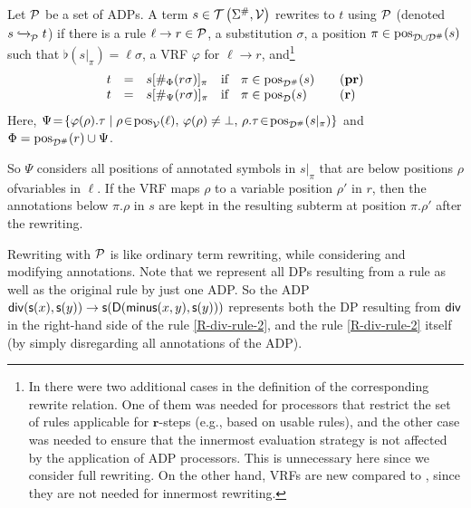 \begin{definition}[$\tored{}{}{\C{P}}$]\label{def:ADP-Rewriting}
    Let $\mathcal{P}$ be a set of ADPs.
    A term $s \in \mathcal{T}\left(\Sigma^\#,\mathcal{V}\right)$ rewrites to $t$ using $\mathcal{P}$
    (denoted $s \mathrel{ \xhookrightarrow{{}_{\scriptstyle }} \!\!{}^{}_{\mathcal{P}} } t$)
if there is a rule $\ell \to r \in \mathcal{P}$, 
    a substitution $\sigma$, a position $\pi \in \mathrm{pos}_{\mathcal{D} \cup \mathcal{D}^\#}(s)$
    such that $\flat(s|_\pi) = \ell\sigma$, a VRF $\varphi$ for $\ell \to r$,
    and\footnote{\label{ADPComparison2}In \cite{FLOPS2024} there
    were two additional cases in the definition of the corresponding rewrite relation. One of
    them was needed for processors that restrict the set of rules applicable for
    $\mathbf{r}$-steps (e.g., based on usable rules), and the other case 
    was needed to
    ensure that the innermost
    evaluation strategy is not affected by the application of ADP processors. This is
    unnecessary here since we consider full rewriting. On the other hand,
     VRFs are new compared to
\cite{FLOPS2024}, since they are not needed for innermost rewriting.}
    \begin{equation*}
        \begin{array}{rll@{\quad}ll@{\qquad}l}
        t &=                  &s[\anno_{\Phi}(r\sigma)]_{\pi}  & 
        \text{if} & \pi \in \posT(s)    & (\mathbf{pr})\\ 
        t &=                  &s[\anno_{\Psi}(r\sigma)]_{\pi}  & 
        \text{if} & \pi \in\pos_\SignatureD(s) & (\mathbf{r})\!
        \end{array}
    \end{equation*}
    Here, $\Psi \!=\! \{\varphi(\rho).\tau \mid \rho \!\in\! \mathrm{pos}_{\mathcal{V}}(\ell), \,
    \varphi(\rho) \neq \bot,  \, \rho.\tau \!\in\! \mathrm{pos}_{\mathcal{D}^\#}(s|_{\pi}) \}$
    and $\Phi = \mathrm{pos}_{\mathcal{D}^\#}(r) \cup \Psi$.
\end{definition}
So $\Psi$ considers all positions of annotated symbols in $s|_{\pi}$ that
are below
positions $\rho$ of\linebreak variables in $\ell$. If the VRF maps $\rho$ to a variable position
$\rho'$ in
$r$, then the annotations below $\pi.\rho$ in $s$ are kept in the resulting subterm at
position $\pi.\rho'$
after the rewriting.

Rewriting with $\mathcal{P}$ is like ordinary term rewriting, while considering and
modifying
annotations.
Note that we represent all DPs resulting from a rule as well as the original
rule by just one ADP.  
So the ADP $\mathsf{div}(\mathsf{s}(x),\mathsf{s}(y)) \to \mathsf{s}(\mathsf{D}(\mathsf{minus}(x,y),\mathsf{s}(y)))$
represents both the DP resulting from $\mathsf{div}$ in the right-hand side
of the rule \eqref{R-div-rule-2}, and the rule \eqref{R-div-rule-2} itself 
(by simply disregarding all annotations of the ADP).

